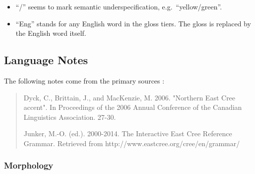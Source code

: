 \documentclass[a4paper, 11pt]{book}
\begin{document}
\begin{itemize}
	\item “/” seems to mark semantic underspecification, e.g.\ “yellow/green”. %
	\item “Eng” stands for any English word in the gloss tiers. The gloss is replaced by the English word itself. 
\end{itemize}


\subsection{Language Notes}

The following notes come from the primary sources \citep{dyck2006northern, junker2000interactive}:

\begin{quote}
Dyck, C., Brittain, J., and MacKenzie, M. 2006. "Northern East Cree accent". In Proceedings of the 2006 Annual Conference of the Canadian Linguistics Association. 27-30.


Junker, M.-O. (ed.). 2000-2014. The Interactive East Cree Reference Grammar. Retrieved from http://www.eastcree.org/cree/en/grammar/
\end{quote}

\subsubsection*{Morphology}
\end{document}
